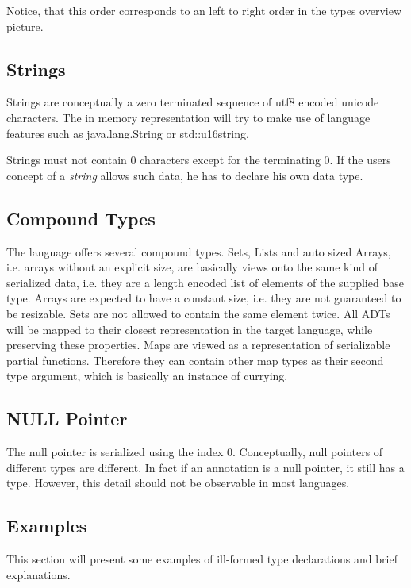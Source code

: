 \documentclass[a4paper,10pt]{article}
\begin{document}
Notice, that this order corresponds to an left to right order in the types overview picture.


\subsection*{Strings}

Strings are conceptually a zero terminated sequence of utf8 encoded unicode characters. The in memory representation will try to make use of language features such as java.lang.String or std::u16string.

Strings must not contain 0 characters except for the terminating 0. If the users concept of a \textit{string} allows such data, he has to declare his own data type.

\subsection*{Compound Types}

The language offers several compound types. Sets, Lists and auto sized Arrays, i.e. arrays without an explicit size, are basically views onto the same kind of serialized data, i.e. they are a length encoded list of elements of the supplied base type. Arrays are expected to have a constant size, i.e. they are not guaranteed to be resizable. Sets are not allowed to contain the same element twice.
All ADTs will be mapped to their closest representation in the target language, while preserving these properties.
Maps are viewed as a representation of serializable partial functions. Therefore they can contain other map types as their second type argument, which is basically an instance of currying.

\subsection*{NULL Pointer}

The null pointer is serialized using the index 0. Conceptually, null pointers of different types are different. In fact if an annotation is a null pointer, it still has a type. However, this detail should not be observable in most languages.


\subsection{Examples}

This section will present some examples of ill-formed type declarations and brief explanations.
\end{document}

